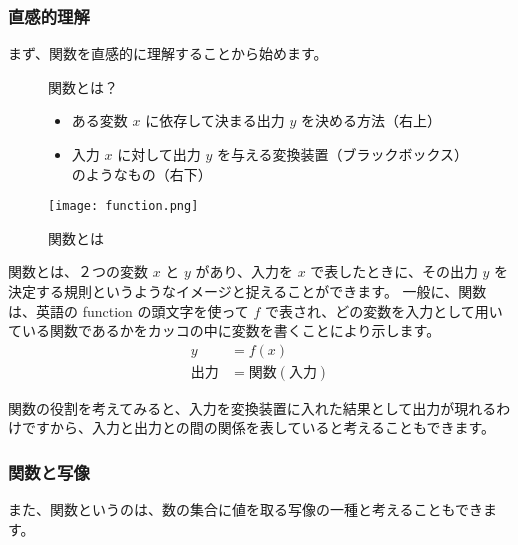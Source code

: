 \documentclass[uplatex,dvipdfmx,a4paper,11pt]{jsreport}
\begin{document}
\subsubsection{直感的理解}
まず、関数を直感的に理解することから始めます。
\begin{figure}[htb]
	\begin{center}
		\begin{minipage}{0.5\textwidth}
			\large
			\begin{itembox}[l]{関数とは？}
				\begin{itemize}
					\item ある変数 $x$ に依存して決まる出力 $y$ を決める方法（右上）
					\item 入力 $x$ に対して出力 $y$ を与える変換装置（ブラックボックス）のようなもの（右下）
				\end{itemize}
			\end{itembox}
			
		\end{minipage}
		\begin{minipage}{0.4\textwidth}
			\begin{center}
			\texttt{[image: function.png]}
			\end{center}
		\end{minipage}
		\caption{関数とは}
		\label{function}
	\end{center}
\end{figure}

関数とは、２つの変数 $x$ と $y$ があり、入力を $x$ で表したときに、その出力 $y$ を決定する規則というようなイメージと捉えることができます。
一般に、関数は、英語の function の頭文字を使って $f$ で表され、どの変数を入力として用いている関数であるかをカッコの中に変数を書くことにより示します。
\begin{align*}
	y&=f(x) \\
	\text{出力}&=\text{関数} \left(\text{入力} \right)
\end{align*}

関数の役割を考えてみると、入力を変換装置に入れた結果として出力が現れるわけですから、入力と出力との間の関係を表していると考えることもできます。

\subsubsection{関数と写像}
また、関数というのは、数の集合に値を取る写像の一種と考えることもできます。
\end{document}
